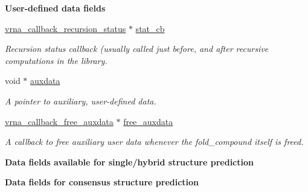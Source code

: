\begin{Indent}{\bf User-\/defined data fields}\par
\begin{DoxyCompactItemize}
\item 
\hyperlink{group__fold__compound_ga4a4a0d838de6d18315bafc84f93f5cc0}{vrna\+\_\+callback\+\_\+recursion\+\_\+status} $\ast$ \hyperlink{group__fold__compound_a87a83f6795b569000efcbe65acc3dd81}{stat\+\_\+cb}
\begin{DoxyCompactList}\small\item\em Recursion status callback (usually called just before, and after recursive computations in the library. \end{DoxyCompactList}\item 
void $\ast$ \hyperlink{group__fold__compound_a20048e0c369e9f24b55423d600037c68}{auxdata}
\begin{DoxyCompactList}\small\item\em A pointer to auxiliary, user-\/defined data. \end{DoxyCompactList}\item 
\hyperlink{group__fold__compound_ga3ae51bfd5fc3236652d1de4e3274b49b}{vrna\+\_\+callback\+\_\+free\+\_\+auxdata} $\ast$ \hyperlink{group__fold__compound_a8e84dbabab016ecd74da6c38cb94e816}{free\+\_\+auxdata}
\begin{DoxyCompactList}\small\item\em A callback to free auxiliary user data whenever the fold\+\_\+compound itself is free\textquotesingle{}d. \end{DoxyCompactList}\end{DoxyCompactItemize}
\end{Indent}
\begin{Indent}{\bf Data fields available for single/hybrid structure prediction}\par
\end{Indent}
\begin{Indent}{\bf Data fields for consensus structure prediction}\par
\end{Indent}
